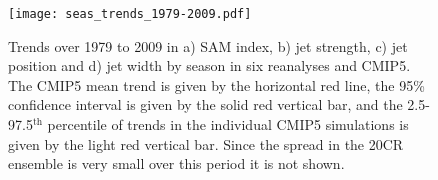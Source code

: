 \documentclass{ametsoc}
\begin{document}
\begin{figure}[t]
  \noindent\texttt{[image: seas\_trends\_1979-2009.pdf]}\\
  \caption{Trends over 1979 to 2009 in a) SAM index, b) jet strength, c) jet position and
   d) jet width by season in six reanalyses and CMIP5. The CMIP5 mean trend is given by
    the horizontal red line, the 95\% confidence interval is given by the solid red 
    vertical bar, and the 2.5-97.5$^\textrm{th}$ percentile of trends in the individual CMIP5 
    simulations is given by the light red vertical 
  bar. Since the spread in the 20CR ensemble is very small over this period it is not shown.
  }\label{fig:seas_trends_1979-2009}
\end{figure}
\end{document}
